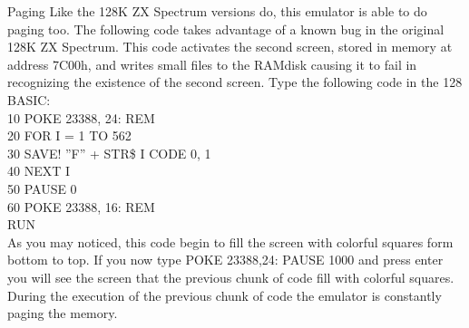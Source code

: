 Paging
Like the 128K ZX Spectrum versions do, this emulator is able to do paging too.
The following code takes advantage of a known bug in the original 128K ZX Spectrum. This code activates the second screen, stored in memory at address 7C00h, and writes small files to the RAMdisk causing it to fail in recognizing the existence of the second screen. Type the following code in the 128 BASIC:\\
10 POKE 23388, 24: REM\\
20 FOR I = 1 TO 562\\
30 SAVE! ''F'' + STR\$ I CODE 0, 1\\
40 NEXT I\\
50 PAUSE 0\\
60 POKE 23388, 16: REM\\
RUN\\
As you may noticed, this code begin to fill the screen with colorful squares form bottom to top. If you now type POKE 23388,24: PAUSE 1000 and press enter you will see the screen that the previous chunk of code fill with colorful squares. During the execution of the previous chunk of code the emulator is constantly paging the memory.

